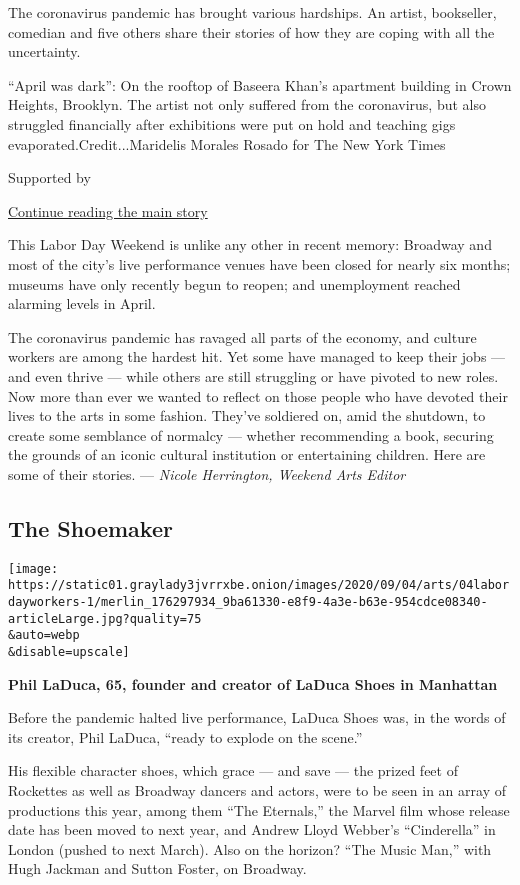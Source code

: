 The coronavirus pandemic has brought various hardships. An artist,
bookseller, comedian and five others share their stories of how they are
coping with all the uncertainty.

``April was dark'': On the rooftop of Baseera Khan's apartment building
in Crown Heights, Brooklyn. The artist not only suffered from the
coronavirus, but also struggled financially after exhibitions were put
on hold and teaching gigs evaporated.Credit...Maridelis Morales Rosado
for The New York Times

Supported by

\protect\hyperlink{after-sponsor}{Continue reading the main story}

This Labor Day Weekend is unlike any other in recent memory: Broadway
and most of the city's live performance venues have been closed for
nearly six months; museums have only recently begun to reopen; and
unemployment reached alarming levels in April.

The coronavirus pandemic has ravaged all parts of the economy, and
culture workers are among the hardest hit. Yet some have managed to keep
their jobs --- and even thrive --- while others are still struggling or
have pivoted to new roles. Now more than ever we wanted to reflect on
those people who have devoted their lives to the arts in some fashion.
They've soldiered on, amid the shutdown, to create some semblance of
normalcy --- whether recommending a book, securing the grounds of an
iconic cultural institution or entertaining children. Here are some of
their stories. --- \emph{Nicole Herrington, Weekend Arts Editor}

\hypertarget{the-shoemaker}{%
\subsection{The Shoemaker}\label{the-shoemaker}}

\texttt{[image: https://static01.graylady3jvrrxbe.onion/images/2020/09/04/arts/04labordayworkers-1/merlin\_176297934\_9ba61330-e8f9-4a3e-b63e-954cdce08340-articleLarge.jpg?quality=75\\\&auto=webp\\\&disable=upscale]}

\textbf{Phil LaDuca, 65, founder and creator of LaDuca Shoes in
Manhattan}

Before the pandemic halted live performance, LaDuca Shoes was, in the
words of its creator, Phil LaDuca, ``ready to explode on the scene.''

His flexible character shoes, which grace --- and save --- the prized
feet of Rockettes as well as Broadway dancers and actors, were to be
seen in an array of productions this year, among them ``The Eternals,''
the Marvel film whose release date has been moved to next year, and
Andrew Lloyd Webber's ``Cinderella'' in London (pushed to next March).
Also on the horizon? ``The Music Man,'' with Hugh Jackman and Sutton
Foster, on Broadway.

